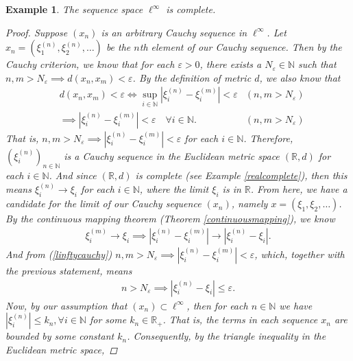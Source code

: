 \documentclass[11pt]{article}
\theoremstyle{mystyle}
\newtheorem{protoexamp}{Example}[section]
\newenvironment{examp}
{\colorlet{shadecolor}{orange!15}\begin{shaded}\begin{protoexamp}}
{\end{protoexamp}\end{shaded}}
\newcommand{\0}{\mathbf{0}}
\begin{document}
\begin{examp}
The sequence space $\ell^{\infty}$ is complete.
\begin{proof}
Suppose $(x_n)$ is an arbitrary Cauchy sequence in $\ell^{\infty}$. Let $x_n = (\xi_1^{(n)}, \xi_2^{(n)}, \ldots )$ be the $n$th element of our Cauchy sequence. Then by the Cauchy criterion, we know that for each $\varepsilon > 0$, there exists a $N_{\varepsilon} \in \mathbb{N}$ such that $n, m > N_{\varepsilon} \implies d(x_n, x_m) < \varepsilon$. By the definition of metric $d$, we also know that
\begin{align}
    &d(x_n, x_m) < \varepsilon \iff \sup_{i \in \mathbb{N}} | \xi_i^{(n)} - \xi_i^{(m)}| < \varepsilon & (n, m > N_{\varepsilon})\nonumber\\
    &\implies | \xi_i^{(n)} - \xi_i^{(m)}| < \varepsilon \quad \text{$\forall i \in \mathbb{N}$}. & (n, m > N_{\varepsilon})\label{linftycauchy}
\end{align}
That is, $n, m > N_{\varepsilon} \implies | \xi_i^{(n)} - \xi_i^{(m)}| < \varepsilon$ for each $i \in \mathbb{N}$. Therefore, $\left(\xi_i^{(n)} \right)_{n \in \mathbb{N}}$ is a Cauchy sequence in the Euclidean metric space $(\mathbb{R}, d)$ for each $i \in \mathbb{N}$. And since $(\mathbb{R}, d)$ is complete (see Example \ref{realcomplete}), then this means $\xi_i^{(n)} \longrightarrow \xi_i$ for each $i \in \mathbb{N}$, where the limit $\xi_i$ is in $\mathbb{R}$.\newline
From here, we have a candidate for the limit of our Cauchy sequence $(x_n)$, namely $x = (\xi_1, \xi_2, \ldots)$. By the continuous mapping theorem (Theorem \ref{continuousmapping}), we know 
\begin{align*}
    \xi_i^{(m)} \longrightarrow \xi_i \implies  | \xi_i^{(n)} - \xi_i^{(m)}| \longrightarrow | \xi_i^{(n)} - \xi_i|.
\end{align*} 
And from (\ref{linftycauchy}) $n, m > N_{\varepsilon} \implies | \xi_i^{(n)} - \xi_i^{(m)}| < \varepsilon$, which, together with the previous statement, means 
\begin{align}\label{linftybound}
     n  > N_{\varepsilon} \implies |\xi_i^{(n)} - \xi_i| \leq \varepsilon.
\end{align}
Now, by our assumption that $(x_n) \subset \ell^{\infty}$, then for each $n \in \mathbb{N}$ we have $|\xi_i^{(n)}| \leq k_n, \forall i \in \mathbb{N}$ for some $k_n \in \mathbb{R}_+$. That is, the terms in each sequence $x_n$ are bounded by some constant $k_n$. Consequently, by the triangle inequality in the Euclidean metric space,

\end{proof}
\end{examp}
\end{document}
